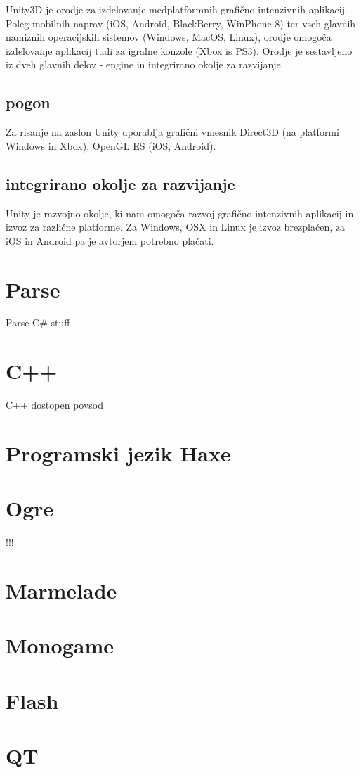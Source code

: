 Unity3D je orodje za izdelovanje medplatformnih grafično intenzivnih aplikacij. Poleg mobilnih naprav (iOS, Android, BlackBerry, WinPhone 8) ter vseh glavnih namiznih operacijskih sistemov (Windows, MacOS, Linux), orodje omogoča izdelovanje aplikacij tudi za igralne konzole (Xbox is PS3). Orodje je sestavljeno iz dveh glavnih delov - engine in integrirano okolje za razvijanje.

\subsection{pogon}

Za risanje na zaslon Unity uporablja grafični vmesnik Direct3D (na platformi Windows in Xbox), OpenGL ES (iOS, Android). 

\subsection{integrirano okolje za razvijanje} 


Unity je razvojno okolje, ki nam omogoča razvoj grafično intenzivnih aplikacij in izvoz za različne platforme. Za Windows, OSX in Linux je izvoz brezplačen, za iOS in Android pa je avtorjem potrebno plačati.

\section{Parse\cite{parse}}

Parse C\# stuff

\section{C++}

C++ dostopen povsod

\section{Programski jezik Haxe}
\section{Ogre}
!!!
\section{Marmelade}
\section{Monogame}

\section{Flash}

\section{QT}
